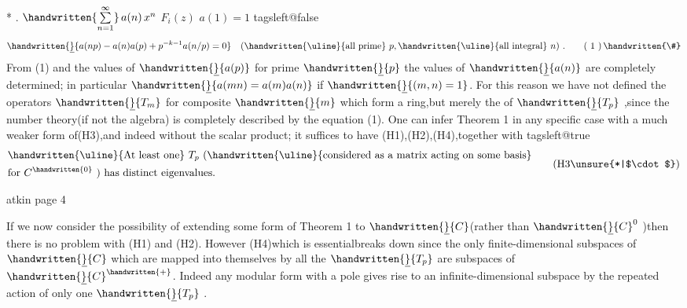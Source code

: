 *  .  $\handwritten{\sum\limits_{n=1}^{\infty}}\,a(n)\,x^{n}$  $F_i(z)$  $a(1)=1$ 
\csname tagsleft@false\endcsname
\[
\handwritten{\underline}{a(np)-a(n)a(p)+p^{-k-1}a(n/p)=0}\quad
(\text{\handwritten{\uline}{all prime} }p,\text{\handwritten{\uline}{all integral} }n)\ .
\tag*{( 1 )\,\handwritten{\#}}
\]
From (1) and the values of $\handwritten{\underline}{a(p)}$ for prime $\handwritten{\underline}{p}$ the values of $\handwritten{\underline}{a(n)}$ are completely determined; in particular $\handwritten{\underline}{a(mn)=a(m)a(n)}$ if $\handwritten{\underline}{(m,n)=1}$. For this reason we have not defined the operators $\handwritten{\underline}{T_m}$ for composite $\handwritten{\underline}{m}$ which form a ring,but merely the  of $\handwritten{\underline}{T_p}$ ,since the number theory(if not the algebra) is completely described by the equation (1). One can infer Theorem 1 in any specific case with a much weaker form of(H3),and indeed without the scalar product; it suffices to have (H1),(H2),(H4),together with
\csname tagsleft@true\endcsname
\[
\begin{aligned}
&\text{\handwritten{\uline}{At least one} } T_p\ \text{(\handwritten{\uline}{considered as a matrix acting on some basis}}\\
&\text{for } C^{\handwritten{0}}\text{ ) has distinct eigenvalues.}
\end{aligned}
\tag*{(H3\unsure{*|$\cdot$})}
\]
\endgroup

\begin{center}atkin page 4\end{center}

If we now consider the possibility of extending some form of Theorem 1 to $\handwritten{\underline}{C}$(rather than $\handwritten{\underline}{C}^{0}$ )then there is no problem with (H1) and (H2). However\deleted{\unsure{,}} (H4)\handwritten{,}which is essential\handwritten{,}breaks down since the only finite-dimensional subspaces of $\handwritten{\underline}{C}$ which are mapped into themselves by all the $\handwritten{\underline}{T_p}$ are subspaces of $\handwritten{\underline}{C}^{\handwritten{+}}$. Indeed any modular form with a pole gives rise to an infinite-dimensional subspace by the repeated action of only one $\handwritten{\underline}{T_p}$ .

